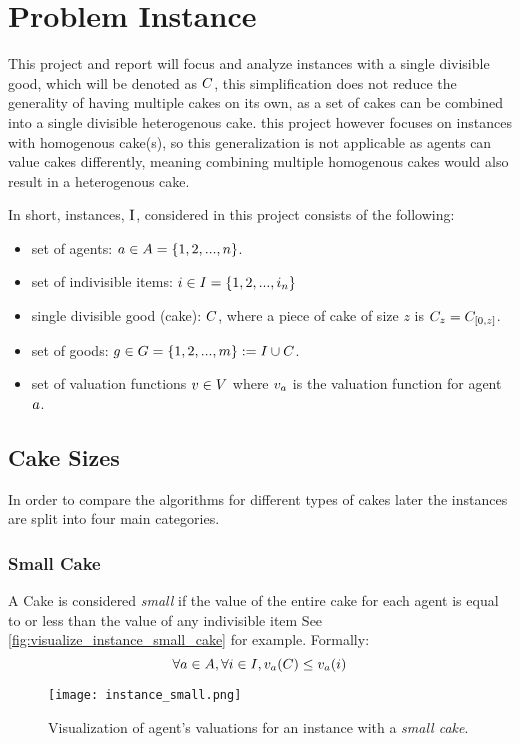 

\section{Problem Instance}
This project and report will focus and analyze instances with a single divisible good, which will be denoted as $C$, this simplification does not reduce the generality of having multiple cakes on its own, as a set of cakes can be combined into a single divisible heterogenous cake. this project however focuses on instances with homogenous cake(s), so this generalization is not applicable as agents can value cakes differently, meaning combining multiple homogenous cakes would also result in a heterogenous cake.

In short, instances, $\sInstance$, considered in this project consists of the following:
\begin{itemize}
    \item set of agents: $a\in A=\{1,2,...,n\}$.
    \item set of indivisible items: $i\in I=\{1,2,...,i_n\}$
    \item single divisible good (cake): $C$, where a piece of cake of size $z$ is $C_z=C_{[0,z]}$.
    \item set of goods: $g\in G=\{1,2,...,m\}:=I\cup C$.
    \item set of valuation functions $v \in V$ where $v_a$ is the valuation function for agent $a$.
\end{itemize}



\subsection{Cake Sizes}\label{subsec:cake-sizes}
In order to compare the algorithms for different types of cakes later the instances are split into four main categories. 

\subsubsection*{Small Cake}\label{subsubsec:small-cake}
A Cake is considered \textit{small} if the value of the entire cake for each agent is equal to or less than the value of any indivisible item See \autoref{fig:visualize_instance_small_cake} for example. Formally:
$$\forall a\in A, \forall i\in I, v_a(C)\leq v_a(i)$$
\begin{figure}
    \centering
    \texttt{[image: instance\_small.png]}
    \caption{Visualization of agent's valuations for an instance with a \textit{small cake}.}
    \label{fig:visualize_instance_small_cake}
\end{figure}

